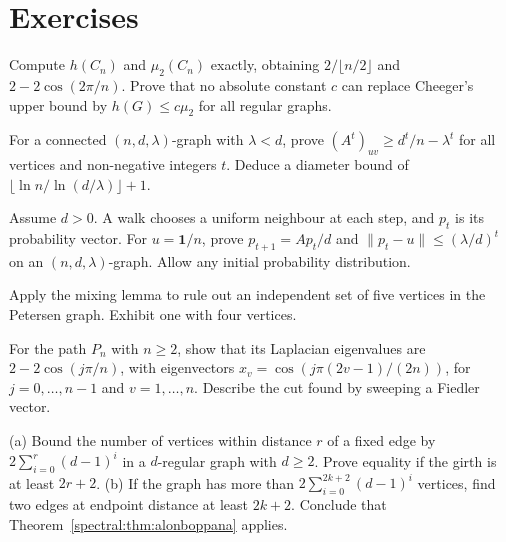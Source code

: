 \section{Exercises}
\begin{exercise}[$\star$]\label{spectral:ex:cheegercycle}
Compute $h(C_n)$ and $\mu_2(C_n)$ exactly, obtaining $2/\lfloor n/2\rfloor$ and $2-2\cos(2\pi/n)$. Prove that no absolute constant $c$ can replace Cheeger's upper bound by $h(G)\le c\mu_2$ for all regular graphs.
\end{exercise}
\begin{exercise}[$\star\star$]\label{spectral:ex:diameter}
For a connected $(n,d,\lambda)$-graph with $\lambda<d$, prove $(A^t)_{uv}\ge d^t/n-\lambda^t$ for all vertices and non-negative integers $t$. Deduce a diameter bound of $\lfloor\ln n/\ln(d/\lambda)\rfloor+1$.
\end{exercise}
\begin{exercise}[$\star$]\label{spectral:ex:walkmixing}
Assume $d>0$. A walk chooses a uniform neighbour at each step, and $p_t$ is its probability vector. For $u=\mathbf1/n$, prove $p_{t+1}=Ap_t/d$ and $\|p_t-u\|\le(\lambda/d)^t$ on an $(n,d,\lambda)$-graph. Allow any initial probability distribution.
\end{exercise}
\begin{exercise}[$\star$]\label{spectral:ex:petersenalpha}
Apply the mixing lemma to rule out an independent set of five vertices in the Petersen graph. Exhibit one with four vertices.
\end{exercise}
\begin{exercise}[$\star\star$]\label{spectral:ex:fiedlerpath}
For the path $P_n$ with $n\ge2$, show that its Laplacian eigenvalues are $2-2\cos(j\pi/n)$, with eigenvectors $x_v=\cos(j\pi(2v-1)/(2n))$, for $j=0,\ldots,n-1$ and $v=1,\ldots,n$. Describe the cut found by sweeping a Fiedler vector.
\end{exercise}
\begin{exercise}[$\star$]\label{spectral:ex:moorebound}
(a) Bound the number of vertices within distance $r$ of a fixed edge by $2\sum_{i=0}^r(d-1)^i$ in a $d$-regular graph with $d\ge2$. Prove equality if the girth is at least $2r+2$.
(b) If the graph has more than $2\sum_{i=0}^{2k+2}(d-1)^i$ vertices, find two edges at endpoint distance at least $2k+2$. Conclude that Theorem~\ref{spectral:thm:alonboppana} applies.
\end{exercise}

